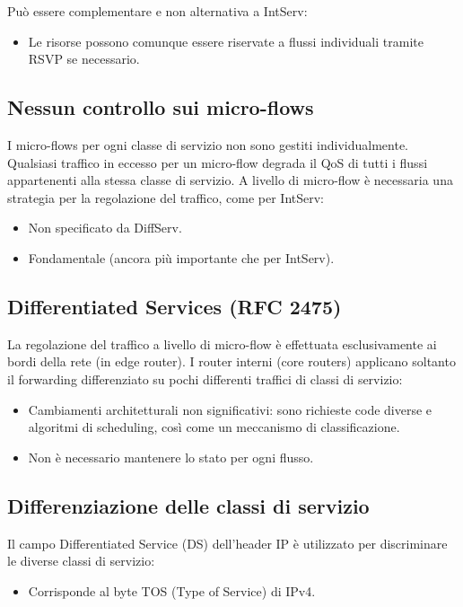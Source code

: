 Può essere complementare e non alternativa a IntServ:
\begin{itemize}
	\item Le risorse possono comunque essere riservate a flussi individuali tramite RSVP se necessario.
\end{itemize}

\subsection{Nessun controllo sui micro-flows}
I micro-flows per ogni classe di servizio non sono gestiti individualmente. Qualsiasi traffico in eccesso per un micro-flow degrada il QoS di tutti i flussi appartenenti alla stessa classe di servizio. A livello di micro-flow è necessaria una strategia per la regolazione del traffico, come per IntServ:
\begin{itemize}
	\item Non specificato da DiffServ.
	\item Fondamentale (ancora più importante che per IntServ).
\end{itemize}

\subsection{Differentiated Services (RFC 2475)}
La regolazione del traffico a livello di micro-flow è effettuata esclusivamente ai bordi della rete (in edge router). I router interni (core routers) applicano soltanto il forwarding differenziato su pochi differenti traffici di classi di servizio:
\begin{itemize}
	\item Cambiamenti architetturali non significativi: sono richieste code diverse e algoritmi di scheduling, così come un meccanismo di classificazione.
	\item Non è necessario mantenere lo stato per ogni flusso.
\end{itemize}

\subsection{Differenziazione delle classi di servizio}
Il campo Differentiated Service (DS) dell'header IP è utilizzato per discriminare le diverse classi di servizio:
\begin{itemize}
	\item Corrisponde al byte TOS (Type of Service) di IPv4.
\end{itemize}

